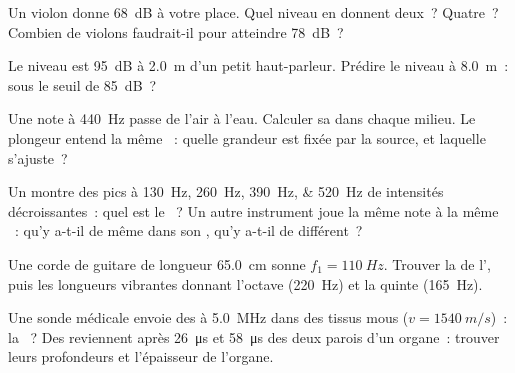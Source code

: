 \begin{exercise}[$\star\star$]\label{exo:g12:sound-acoustics:7}
Un violon donne \qty{68}{dB} à votre place. Quel niveau en donnent
deux~? Quatre~? Combien de violons faudrait-il pour atteindre
\qty{78}{dB}~?
\end{exercise}

\begin{exercise}[$\star\star$]\label{exo:g12:sound-acoustics:8}
Le niveau est \qty{95}{dB} à \qty{2.0}{m} d'un petit haut-parleur.
Prédire le niveau à \qty{8.0}{m}~: sous le seuil de \qty{85}{dB}~?
\end{exercise}

\begin{exercise}[$\star\star$]\label{exo:g12:sound-acoustics:9}
Une note à \qty{440}{Hz} passe de l'air à l'eau. Calculer sa
 dans chaque milieu. Le plongeur entend la
même ~: quelle grandeur est fixée par la source, et
laquelle s'ajuste~?
\end{exercise}

\begin{exercise}[$\star\star$]\label{exo:g12:sound-acoustics:10}
Un  montre des pics à \qtylist{130;260;390;520}{Hz} de
intensités décroissantes~: quel est le ~? Un autre
instrument joue la même note à la même
~: qu'y a-t-il de même dans son
, qu'y a-t-il de différent~?
\end{exercise}

\begin{exercise}[$\star\star$]\label{exo:g12:sound-acoustics:11}
Une corde de guitare de longueur \qty{65.0}{cm}
sonne $f_1 = \qty{110}{Hz}$. Trouver la  de
l', puis les longueurs vibrantes donnant l'octave
(\qty{220}{Hz}) et la quinte (\qty{165}{Hz}).
\end{exercise}

\begin{exercise}[$\star\star\star$]\label{exo:g12:sound-acoustics:12}
Une sonde médicale envoie des  à \qty{5.0}{MHz} dans
des tissus mous ($v = \qty{1540}{m/s}$)~: la
~? Des  reviennent après
\qty{26}{\micro s} et \qty{58}{\micro s} des deux parois d'un organe~:
trouver leurs profondeurs et l'épaisseur de l'organe.
\end{exercise}

